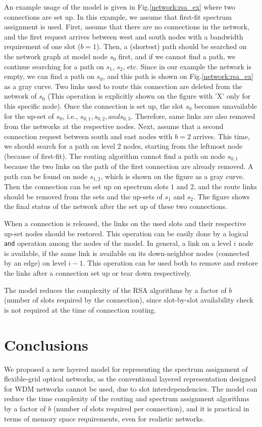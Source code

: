 \documentclass[letterpaper,10pt]{article}\pdfoutput=1
\begin{document}
An example usage of the model is given in Fig.\ref{network:rsa_ex} where two connections are set up.
In this example, we assume that first-fit spectrum assignment is used.
First, assume that there are no connections in the network, and the first request arrives between west and south
nodes with a bandwidth 
requirement of one slot ($b=1$). Then, a (shortest) path should be searched on the network graph at model node 
$s_{0}$ first, and if
we cannot find a path, we continue searching for a path on $s_{1}$, $s_{2}$, etc. Since in our example the
network is empty, we can find a path on $s_{0}$, and this path is shown on Fig.\ref{network:rsa_ex} as a gray
curve. Two links used to route this connection are deleted from the network of $s_{0}$ (This operation is 
explicitly shown on the figure with 'X' only for this specific node). 
Once the connection is set up, the slot $s_{0}$ becomes unavailable
for the up-set of $s_{0}$, i.e., $s_{0,1}, s_{0,2}, and s_{0,3}$. Therefore, same links are also removed 
from the networks at the respective nodes. Next,
assume that a second connection request between south and east nodes with $b=2$ arrives.
This time, we should search for a path on level 2 nodes, starting from the leftmost node (because of 
first-fit). The routing algorithm cannot find a path on node $s_{0,1}$ because the two links on the path of
the first connection are already removed. A path can be found on node $s_{1,2}$, which is shown on the figure
as a gray curve. Then the connection can be set up on spectrum slots $1$ and $2$, and the route links should
be removed from the sets and the up-sets of $s_{1}$ and $s_{2}$. 
The figure shows the final status of the network after the set up of these two connections.

When a connection is released, the links on the used slots and their respective up-set nodes should be restored.
This operation can be easily done by a logical \texttt{and} operation among the nodes of the model. 
In general, a link on a level $i$ node is 
available, if the same link is available on its down-neighbor nodes (connected by an edge) on level $i-1$.
This operation can be used both to remove and restore the links after a connection set up or 
tear down respectively. 

The model reduces the complexity of the RSA algorithms by a factor of $b$ (number of slots required by the 
connection), since slot-by-slot availability check is not required at the time of connection routing.

\section{Conclusions}
We proposed a new layered model for representing the spectrum assignment of flexible-grid optical networks, as the 
conventional layered representation designed for WDM networks cannot be used, due to slot interdependencies. 
The model can reduce the time complexity of the routing and spectrum assignment algorithms by a factor of $b$ 
(number of slots required per connection), and it is practical in terms of memory space requirements, even for
realistic networks. 
\end{document}

